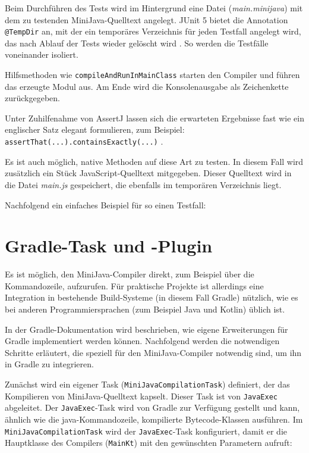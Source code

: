 Beim Durchführen des Tests wird im Hintergrund eine Datei (\emph{main.minijava}) mit dem zu testenden MiniJava-Quelltext angelegt. JUnit 5 bietet die Annotation \lstinline{@TempDir} an, mit der ein temporäres Verzeichnis für jeden Testfall angelegt wird, das nach Ablauf der Tests wieder gelöscht wird \cite{JUnit}. So werden die Testfälle voneinander isoliert.

Hilfsmethoden wie \lstinline{compileAndRunInMainClass} starten den Compiler und führen das erzeugte Modul aus. Am Ende wird die Konsolenausgabe als Zeichenkette zurückgegeben.

Unter Zuhilfenahme von AssertJ lassen sich die erwarteten Ergebnisse fast wie ein englischer Satz elegant formulieren, zum Beispiel: \lstinline{assertThat(...).containsExactly(...)} \cite{AssertJ}.

Es ist auch möglich, native Methoden auf diese Art zu testen. In diesem Fall wird zusätzlich ein Stück JavaScript-Quelltext mitgegeben. Dieser Quelltext wird in die Datei \emph{main.js} gespeichert, die ebenfalls im temporären Verzeichnis liegt.

Nachfolgend ein einfaches Beispiel für so einen Testfall:



\section{Gradle-Task und -Plugin}

Es ist möglich, den MiniJava-Compiler direkt, zum Beispiel über die Kommandozeile, aufzurufen. Für praktische Projekte ist allerdings eine Integration in bestehende Build-Systeme (in diesem Fall Gradle) nützlich, wie es bei anderen Programmiersprachen (zum Beispiel Java und Kotlin) üblich ist.

In der Gradle-Dokumentation \cite{Gradle} wird beschrieben, wie eigene Erweiterungen für Gradle implementiert werden können. Nachfolgend werden die notwendigen Schritte erläutert, die speziell für den MiniJava-Compiler notwendig sind, um ihn in Gradle zu integrieren.

Zunächst wird ein eigener Task (\lstinline{MiniJavaCompilationTask}) definiert, der das Kompilieren von MiniJava-Quelltext kapselt. Dieser Task ist von \lstinline{JavaExec} abgeleitet. Der \lstinline{JavaExec}-Task wird von Gradle zur Verfügung gestellt und kann, ähnlich wie die java-Komman\-dozeile, kompilierte Bytecode-Klassen ausführen. Im \lstinline{MiniJavaCompilationTask} wird der \lstinline{JavaExec}-Task konfiguriert, damit er die Hauptklasse des Compilers (\lstinline{MainKt}) mit den gewünschten Parametern aufruft:


